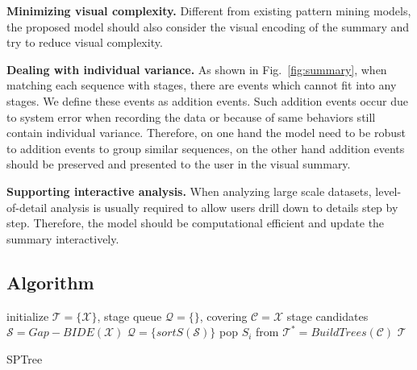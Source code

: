 \begin{compactitem}
	\item \textbf{Minimizing visual complexity.} Different from existing pattern mining models, the proposed model should also consider the visual encoding of the summary and try to reduce visual complexity.
	\item \textbf{Dealing with individual variance.} As shown in Fig.~\ref{fig:summary}, when matching each sequence with stages, there are events which cannot fit into any stages. We define these events as addition events. Such addition events occur due to system error when recording the data or because of same behaviors still contain individual variance. Therefore, on one hand the model need to be robust to addition events to group similar sequences, on the other hand addition events should be preserved and presented to the user in the visual summary.  
	\item \textbf{Supporting interactive analysis.} When analyzing large scale datasets, level-of-detail analysis is usually required to allow users drill down to details step by step. Therefore, the model should be computational efficient and update the summary interactively.
\end{compactitem}

\subsection{Algorithm}

\begin{algorithm}
	initialize $\mathscr{T}=\{\mathscr{X}\}$, stage queue $\mathscr{Q}=\{\}$, covering $\mathscr{C}=\mathscr{X}$\;
	stage candidates $\mathscr{S}=Gap-BIDE(\mathscr{X})$\;
	$\mathscr{Q}=\{sortS(\mathscr{S})\}$\;
	 {
		pop $S_i$ from \;
		$\mathscr{T^\ast}=BuildTrees(\mathscr{C})$\;
	}
	\Return $\mathscr{T}$
	\caption{SPTree}
	\label{algorithm:pipeline}
\end{algorithm} 

